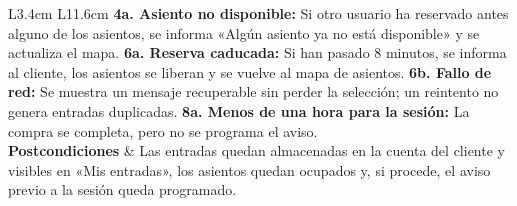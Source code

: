 \documentclass[11pt,a4paper]{article}
\begin{document}
\begin{longtable}{L{3.4cm} L{11.6cm}}
\textbf{4a. Asiento no disponible:} Si otro usuario ha reservado antes alguno de los asientos, se informa «Algún asiento ya no está disponible» y se actualiza el mapa.\newline
\textbf{6a. Reserva caducada:} Si han pasado 8 minutos, se informa al cliente, los asientos se liberan y se vuelve al mapa de asientos.\newline
\textbf{6b. Fallo de red:} Se muestra un mensaje recuperable sin perder la selección; un reintento no genera entradas duplicadas.\newline
\textbf{8a. Menos de una hora para la sesión:} La compra se completa, pero no se programa el aviso. \\
\textbf{Postcondiciones} & Las entradas quedan almacenadas en la cuenta del cliente y visibles en «Mis entradas», los asientos quedan ocupados y, si procede, el aviso previo a la sesión queda programado. \\
\end{longtable}
\end{document}
